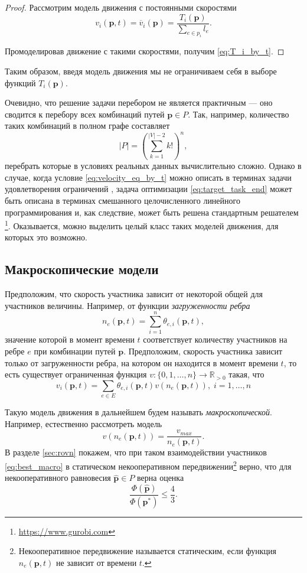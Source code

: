 \documentclass[12pt, a4paper]{article}
\begin{document}
\begin{proof}
Рассмотрим модель движения с постоянными скоростями  
$$v_i(\textbf{p}, t) = \overline{v}_i(\textbf{p}) = \frac{T_i (\textbf{p})}{\sum \limits_{e \in p_i} l_e}.$$

Промоделировав движение с такими скоростями, получим \eqref{eq:T_i_by_t}.
\end{proof}

Таким образом, введя модель движения мы не ограничиваем себя в выборе функций $T_i (\textbf{p})$.

Очевидно, что решение задачи перебором не является практичным --- оно сводится к перебору всех комбинаций путей $\textbf{p} \in P$. Так, например, количество таких комбинаций в полном графе составляет $$|P| = \left(\sum\limits_{k = 1}^{|V| - 2} k!\right)^n,$$ перебрать которые в условиях реальных данных вычислительно сложно.
Однако в случае, когда условие \eqref{eq:velocity_eq_by_t} можно описать в терминах задачи удовлетворения ограничений \cite{UO}, задача оптимизации \eqref{eq:target_task_end} может быть описана в терминах смешанного целочисленного линейного программирования и, как следствие, может быть решена стандартным решателем \footnote{\url{https://www.gurobi.com}}. Оказывается, можно выделить целый класс таких моделей движения, для которых это возможно.

\subsection{Макроскопические модели}

Предположим, что скорость участника зависит от некоторой общей для участников величины. Например, от функции \textit{загруженности ребра}
$$ n_{e}(\textbf{p}, t) = \sum\limits_{i = 1}^n\theta_{e, i}(\textbf{p}, t),$$
значение которой в момент времени $t$ соответствует количеству участников на ребре $e$ при комбинации путей $\textbf{p}$. Предположим, скорость участника зависит только от загруженности ребра, на котором он находится в момент времени $t$, то есть существует ограниченная функция $v : \{0, 1, \dots, n\} \rightarrow \mathbb{R}_{> 0}$ такая, что
\begin{equation}
	\label{eq:velocity_eq_macro}
	 v_i(\textbf{p}, t) = \sum \limits _{e \in E} \theta_{e, i} (\textbf{p}, t) v (n_e (\textbf{p}, t)), \; i = 1, \dots, n
\end{equation}

Такую модель движения в дальнейшем будем называть \textit{макроскопической}.
Например, естественно рассмотреть модель
\begin{equation}
\label{eq:best_macro}
v (n_e (\textbf{p}, t)) = \frac{v_{max}}{n_e (\textbf{p}, t)}. 
\end{equation}
В разделе \ref{sec:rovn} покажем, что при таком взаимодействии участников \eqref{eq:best_macro} в статическом некооперативном передвижении\footnote{Некооперативное передвижение называется статическим, если функция $n_e (\textbf{p}, t)$ не зависит от времени $t$.} верно, что для некооперативного равновесия $\widehat{\textbf{p}} \in P$ верна оценка
 $$ \frac{\Phi(\widehat{\textbf{p}})}{\Phi(\textbf{p}^*)} \le \frac{4}{3}.$$
 
\end{document}

